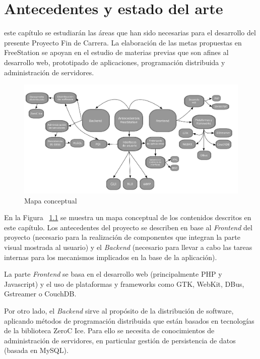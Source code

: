 \cleardoublepage
\chapter{Antecedentes y estado del arte}
\thispagestyle{fancy}

 este capítulo se estudiarán las áreas que han sido necesarias para
el desarrollo del presente Proyecto Fin de Carrera. La  elaboración de
las metas propuestas en FreeStation se apoyan en el estudio de materias 
previas que son afines al desarrollo web, prototipado de
aplicaciones, programación distribuida y administración de servidores.

\begin{figure}[ht]
    \begin{center}
        \includegraphics[width=450px]{src/img/conceptual-map-vectorized.pdf}
        \caption[Mapa conceptual] {Mapa conceptual}
        \label{fig:MapaConceptual}
    \end{center}
\end{figure}

En la Figura ~\ref{fig:MapaConceptual} se muestra un mapa conceptual de los
contenidos descritos en este capítulo. Los antecedentes del proyecto se
describen en base al \emph{Frontend} del proyecto (necesario para la realización
de componentes que integran la parte visual mostrada al usuario) y el
\emph{Backend} (necesario para llevar a cabo las tareas internas para los
mecanismos implicados en la base de la aplicación). 

\newpage
La parte \emph{Frontend} se basa en el desarrollo web (principalmente PHP y Javascript)
y el uso de plataformas y frameworks como GTK, WebKit, DBus, Gstreamer o
CouchDB.

Por otro lado, el \emph{Backend} sirve al propósito de la distribución de software,
aplicando métodos de programación distribuida que están basados en tecnologías
de la biblioteca ZeroC Ice. Para ello se necesita de conocimientos de administración de
servidores, en particular gestión de persistencia de datos (basada en MySQL).

